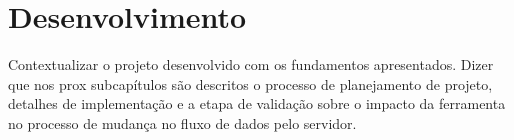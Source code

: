 \chapter{Desenvolvimento}

Contextualizar o projeto desenvolvido com os fundamentos apresentados. Dizer que nos prox subcapítulos são descritos o processo de planejamento de projeto, detalhes de implementação e a etapa de validação sobre o impacto da ferramenta no processo de mudança no fluxo de dados pelo servidor.




